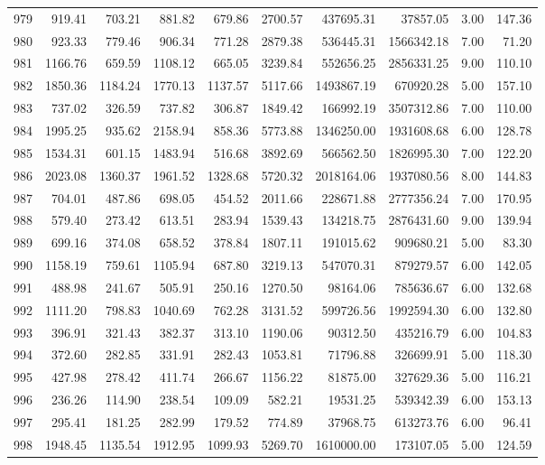 \begin{tabular}{lrrrrrrrrr}
979 & 919.41 & 703.21 & 881.82 & 679.86 & 2700.57 & 437695.31 & 37857.05 & 3.00 & 147.36 \\
980 & 923.33 & 779.46 & 906.34 & 771.28 & 2879.38 & 536445.31 & 1566342.18 & 7.00 & 71.20 \\
981 & 1166.76 & 659.59 & 1108.12 & 665.05 & 3239.84 & 552656.25 & 2856331.25 & 9.00 & 110.10 \\
982 & 1850.36 & 1184.24 & 1770.13 & 1137.57 & 5117.66 & 1493867.19 & 670920.28 & 5.00 & 157.10 \\
983 & 737.02 & 326.59 & 737.82 & 306.87 & 1849.42 & 166992.19 & 3507312.86 & 7.00 & 110.00 \\
984 & 1995.25 & 935.62 & 2158.94 & 858.36 & 5773.88 & 1346250.00 & 1931608.68 & 6.00 & 128.78 \\
985 & 1534.31 & 601.15 & 1483.94 & 516.68 & 3892.69 & 566562.50 & 1826995.30 & 7.00 & 122.20 \\
986 & 2023.08 & 1360.37 & 1961.52 & 1328.68 & 5720.32 & 2018164.06 & 1937080.56 & 8.00 & 144.83 \\
987 & 704.01 & 487.86 & 698.05 & 454.52 & 2011.66 & 228671.88 & 2777356.24 & 7.00 & 170.95 \\
988 & 579.40 & 273.42 & 613.51 & 283.94 & 1539.43 & 134218.75 & 2876431.60 & 9.00 & 139.94 \\
989 & 699.16 & 374.08 & 658.52 & 378.84 & 1807.11 & 191015.62 & 909680.21 & 5.00 & 83.30 \\
990 & 1158.19 & 759.61 & 1105.94 & 687.80 & 3219.13 & 547070.31 & 879279.57 & 6.00 & 142.05 \\
991 & 488.98 & 241.67 & 505.91 & 250.16 & 1270.50 & 98164.06 & 785636.67 & 6.00 & 132.68 \\
992 & 1111.20 & 798.83 & 1040.69 & 762.28 & 3131.52 & 599726.56 & 1992594.30 & 6.00 & 132.80 \\
993 & 396.91 & 321.43 & 382.37 & 313.10 & 1190.06 & 90312.50 & 435216.79 & 6.00 & 104.83 \\
994 & 372.60 & 282.85 & 331.91 & 282.43 & 1053.81 & 71796.88 & 326699.91 & 5.00 & 118.30 \\
995 & 427.98 & 278.42 & 411.74 & 266.67 & 1156.22 & 81875.00 & 327629.36 & 5.00 & 116.21 \\
996 & 236.26 & 114.90 & 238.54 & 109.09 & 582.21 & 19531.25 & 539342.39 & 6.00 & 153.13 \\
997 & 295.41 & 181.25 & 282.99 & 179.52 & 774.89 & 37968.75 & 613273.76 & 6.00 & 96.41 \\
998 & 1948.45 & 1135.54 & 1912.95 & 1099.93 & 5269.70 & 1610000.00 & 173107.05 & 5.00 & 124.59 \\

\end{tabular}
